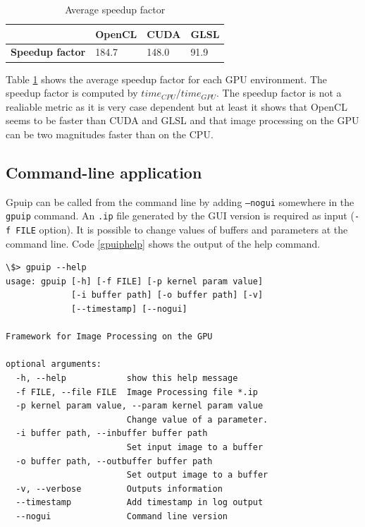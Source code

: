\begin {table}[H]
\caption {Average speedup factor} \label{tabfactor} 
\begin{center}
    \begin{tabular}{| l | l | l | l  |}
    \hline
     & \textbf{OpenCL} & \textbf{CUDA} & \textbf{GLSL} \\ \hline
    \textbf{Speedup factor} & 184.7 & 148.0 & 91.9 \\ \hline
    \end{tabular}
\end{center}
\end{table}

Table \ref{tabfactor} shows the average speedup factor for each GPU environment. The speedup factor is computed by $time_{CPU} / time_{GPU}$. The speedup factor is not a realiable metric as it is very case dependent but at least it shows that OpenCL seems to be faster than CUDA and GLSL and that image processing on the GPU can be two magnitudes faster than on the CPU.


\subsection{Command-line application}

Gpuip can be called from the command line by adding {\tt --nogui} somewhere in the {\tt gpuip} command. An {\tt .ip} file generated by the GUI version is required as input ({\tt -f FILE} option). It is possible to change values of buffers and parameters at the command line. Code \ref{gpuiphelp} shows the output of the help command.
\newline
\renewcommand{\lstlistingname}{Code}
\begin{lstlisting}[caption= gpuip command-line application, label=gpuiphelp]
\$> gpuip --help
usage: gpuip [-h] [-f FILE] [-p kernel param value] 
             [-i buffer path] [-o buffer path] [-v] 
             [--timestamp] [--nogui]

Framework for Image Processing on the GPU

optional arguments:
  -h, --help            show this help message
  -f FILE, --file FILE  Image Processing file *.ip
  -p kernel param value, --param kernel param value
                        Change value of a parameter.
  -i buffer path, --inbuffer buffer path
                        Set input image to a buffer
  -o buffer path, --outbuffer buffer path
                        Set output image to a buffer
  -v, --verbose         Outputs information
  --timestamp           Add timestamp in log output
  --nogui               Command line version
\end{lstlisting}

